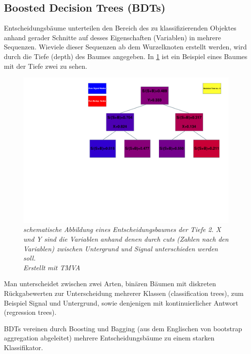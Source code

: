 \subsection{Boosted Decision Trees (BDTs)}
\label{ch:Algorithmen:subsec:BDT}

Entscheidungsb\"aume unterteilen den Bereich des zu klassifizierenden Objektes anhand gerader Schnitte auf desses Eigenschaften (Variablen) in mehrere Sequenzen. Wieviele dieser Sequenzen ab dem Wurzelknoten erstellt werden, wird durch die Tiefe (depth) des Baumes angegeben. In \ref{fig:DecicionTree} ist ein Beispiel eines Baumes mit der Tiefe zwei zu sehen.\\
\begin{figure}[hhh]
 \begin{center}
   \includegraphics[width=\textwidth]{graphics/tree.pdf}
   \parbox[b]{12cm}{
     \caption[Entscheidungsbaumes der Tiefe 2]
             {\label{fig:DecicionTree} \it schematische Abbildung eines Entscheidungsbaumes der Tiefe 2. X und Y sind die Variablen anhand denen durch cuts (Zahlen nach den Variablen) zwischen Untergrund und Signal unterschieden werden soll.\\Erstellt mit TMVA}
   }
 \end{center}
\end{figure}
Man unterscheidet zwischen zwei Arten, bin\"aren B\"aumen mit diskreten R\"uckgabewerten zur Unterscheidung mehrerer Klassen (classification trees), zum Beispiel Signal und Untergrund, sowie denjenigen mit kontinuierlicher Antwort (regression trees).\cite{SWB-455193959}

BDTs vereinen durch Boosting und Bagging (aus dem Englischen von bootstrap aggregation abgeleitet) mehrere Entscheidungsb\"aume zu einem starken Klassifikator.



